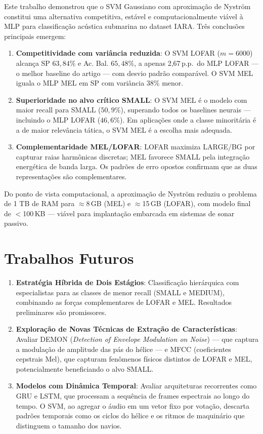 \documentclass[a4paper,12pt]{article}
\begin{document}
Este trabalho demonstrou que o SVM Gaussiano com aproximação de Nyström constitui uma alternativa competitiva, estável e computacionalmente viável à MLP para classificação acústica submarina no dataset IARA. Três conclusões principais emergem:

\begin{enumerate}
    \item \textbf{Competitividade com variância reduzida}: O SVM LOFAR ($m=6000$) alcança SP $63{,}84\%$ e Ac. Bal. $65{,}48\%$, a apenas 2,67\,p.p.\ do MLP LOFAR — o melhor baseline do artigo — com desvio padrão comparável. O SVM MEL iguala o MLP MEL em SP com variância 38\% menor.

    \item \textbf{Superioridade no alvo crítico SMALL}: O SVM MEL é o modelo com maior recall para SMALL ($50{,}9\%$), superando todos os baselines neurais — incluindo o MLP LOFAR ($46{,}6\%$). Em aplicações onde a classe minoritária é a de maior relevância tática, o SVM MEL é a escolha mais adequada.

    \item \textbf{Complementaridade MEL/LOFAR}: LOFAR maximiza LARGE/BG por capturar raias harmônicas discretas; MEL favorece SMALL pela integração energética de banda larga. Os padrões de erro opostos confirmam que as duas representações são complementares.
\end{enumerate}

Do ponto de vista computacional, a aproximação de Nyström reduziu o problema de 1 TB de RAM para $\approx$8\,GB (MEL) e $\approx$15\,GB (LOFAR), com modelo final de $<$100\,KB — viável para implantação embarcada em sistemas de sonar passivo.

\section{Trabalhos Futuros}

\begin{enumerate}
    \item \textbf{Estratégia Híbrida de Dois Estágios}: Classificação hierárquica com especialistas para as classes de menor recall (SMALL e MEDIUM), combinando as forças complementares de LOFAR e MEL. Resultados preliminares são promissores.

    \item \textbf{Exploração de Novas Técnicas de Extração de Características}: Avaliar DEMON (\textit{Detection of Envelope Modulation on Noise}) — que captura a modulação de amplitude das pás do hélice — e MFCC (coeficientes cepstrais Mel), que capturam fenômenos físicos distintos de LOFAR e MEL, potencialmente beneficiando o alvo SMALL.

    \item \textbf{Modelos com Dinâmica Temporal}: Avaliar arquiteturas recorrentes como GRU e LSTM, que processam a sequência de frames espectrais ao longo do tempo. O SVM, ao agregar o áudio em um vetor fixo por votação, descarta padrões temporais como os ciclos do hélice e os ritmos de maquinário que distinguem o tamanho dos navios.
\end{enumerate}
\end{document}
